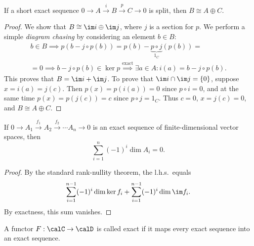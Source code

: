 \begin{prop}
    If a short exact sequence $0\to A\overset i\to B\overset p \to C\to 0$ is split, then $B\cong A\oplus C$.
\end{prop}
\begin{proof}
    We show that $B\cong \im i\oplus \im j$, where $j$ is a section for $p$. We perform a simple \emph{diagram chasing} by considering an element $b\in B$:
    \begin{multline}
        b\in B\implies p(b-j\circ p(b))=p(b)-\underbrace{p\circ j}_{1_C}(p(b))=\\=0\implies b-j\circ p(b)\in\ker p\overset{\text{exact}}{\implies}\exists a\in A: i(a)=b-j\circ p(b).
    \end{multline}
    This proves that $B=\im i+\im j$. To prove that $\im i\cap \im j=\{0\}$, suppose $x=i(a)=j(c)$. Then $p(x)=p(i(a))=0$ since $p\circ i=0$, and at the same time $p(x)=p(j(c))=c$ since $p\circ j=1_C$. Thus $c=0$, $x=j(c)=0$, and $B\cong A\oplus C$.
\end{proof}

\begin{prop}\label{gen rank-nullity}
    If $0\to A_1\overset{f_1}\to A_2 \overset{f_2}\to\cdots A_n\to 0$ is an exact sequence of finite-dimensional vector spaces, then
    \[\sum_{i=1}^n(-1)^i \dim A_i=0.\]
\end{prop}
\begin{proof}
    By the standard rank-nullity theorem, the l.h.s.\ equals \[\sum_{i=1}^{n-1}(-1)^i\dim \ker f_i+\sum_{i=1}^{n-1}(-1)^i\dim \im f_i.\] By exactness, this sum vanishes.
\end{proof}


\begin{defn}
    A functor $F:\calC\to\calD$ is called exact if it maps every exact sequence into an exact sequence.
\end{defn}

